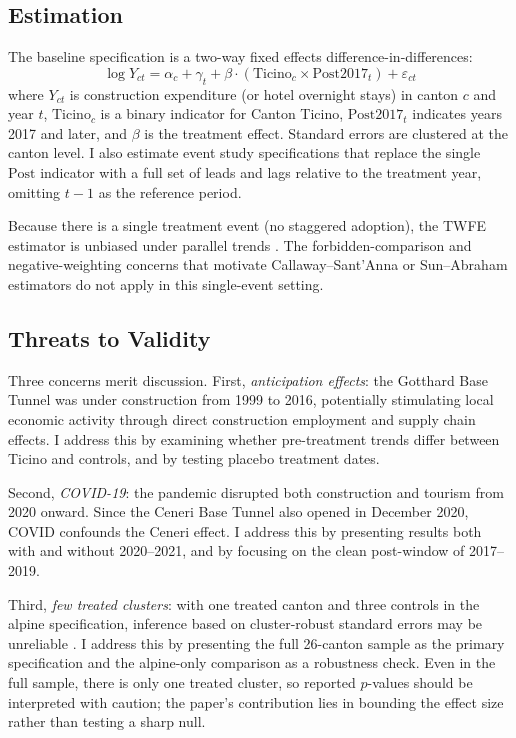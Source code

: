 \documentclass[12pt]{article}
\begin{document}
\subsection{Estimation}

The baseline specification is a two-way fixed effects difference-in-differences:
\begin{equation}
\log Y_{ct} = \alpha_c + \gamma_t + \beta \cdot (\text{Ticino}_c \times \text{Post2017}_t) + \varepsilon_{ct}
\label{eq:did}
\end{equation}
where $Y_{ct}$ is construction expenditure (or hotel overnight stays) in canton $c$ and year $t$, $\text{Ticino}_c$ is a binary indicator for Canton Ticino, $\text{Post2017}_t$ indicates years 2017 and later, and $\beta$ is the treatment effect. Standard errors are clustered at the canton level. I also estimate event study specifications that replace the single $\text{Post}$ indicator with a full set of leads and lags relative to the treatment year, omitting $t-1$ as the reference period.

Because there is a single treatment event (no staggered adoption), the TWFE estimator is unbiased under parallel trends \citep{de_chaisemartin2020, goodman-bacon2021}. The forbidden-comparison and negative-weighting concerns that motivate Callaway--Sant'Anna or Sun--Abraham estimators do not apply in this single-event setting.

\subsection{Threats to Validity}

Three concerns merit discussion. First, \textit{anticipation effects}: the Gotthard Base Tunnel was under construction from 1999 to 2016, potentially stimulating local economic activity through direct construction employment and supply chain effects. I address this by examining whether pre-treatment trends differ between Ticino and controls, and by testing placebo treatment dates.

Second, \textit{COVID-19}: the pandemic disrupted both construction and tourism from 2020 onward. Since the Ceneri Base Tunnel also opened in December 2020, COVID confounds the Ceneri effect. I address this by presenting results both with and without 2020--2021, and by focusing on the clean post-window of 2017--2019.

Third, \textit{few treated clusters}: with one treated canton and three controls in the alpine specification, inference based on cluster-robust standard errors may be unreliable \citep{conley2011}. I address this by presenting the full 26-canton sample as the primary specification and the alpine-only comparison as a robustness check. Even in the full sample, there is only one treated cluster, so reported $p$-values should be interpreted with caution; the paper's contribution lies in bounding the effect size rather than testing a sharp null.
\end{document}
